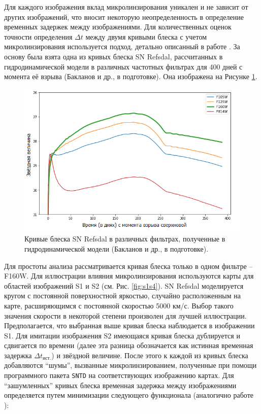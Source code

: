 Для каждого изображения вклад микролинзирования уникален и не зависит от других изображений, что вносит некоторую неопределенность в определение временных задержек между изображениями. Для количественных оценок точности определения $\Delta t$ между двумя кривыми блеска с учетом микролинзирования используется подход, детально описанный в работе \cite{doblerkeeton2006}. За основу была взята одна из кривых блеска SN Refsdal, рассчитанных в гидродинамической модели в различных частотных фильтрах для 400 дней с момента её взрыва (Бакланов и др., в подготовке). Она изображена на Рисунке \ref{fig:lightcurves}. 

\begin{figure}[H]
    \centering
	\includegraphics[scale=0.60]{pics/lightcurves.png}
	\caption{Кривые блеска SN Refsdal в различных фильтрах, полученные в гидродинамической модели (Бакланов и др., в подготовке). \label{fig:lightcurves}} 
\end{figure}

Для простоты анализа рассматривается кривая блеска только в одном фильтре -- F160W. Для иллюстрации влияния микролинзирования используются карты для областей изображений S1 и S2 (см. Рис. \ref{fig:s1s4}). SN Refsdal моделируется кругом с постоянной поверхностной яркостью, случайно расположенным на карте, расширяющимся с постоянной скоростью 5000 км/с. Выбор такого значения скорости в некоторой степени произволен для лучшей иллюстрации. Предполагается, что выбранная выше кривая блеска наблюдается в изображении S1. Для имитации изображения S2 имеющаяся кривая блеска дублируется и сдвигается по времени (далее эта разница обозначается как истинная временная задержка $\Delta t_{\textrm{ист.}}$) и звёздной величине. После этого к каждой из кривых блеска добавляются “шумы”, вызванные микролинзированием, полученные при помощи программного пакета {\tt{SNTD}} на соответствующих изображению картах. Для “зашумленных” кривых блеска временная задержка между изображениями определяется путем минимизации следующего функционала (аналогично работе \cite{doblerkeeton2006}):


